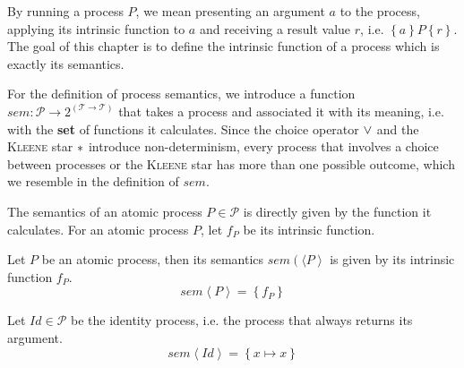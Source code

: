 By running a process $P$, we mean presenting an argument $a$ to the process, applying its intrinsic function to $a$ and receiving a result value $r$, i.e. $\left\{ a \right\} P \left\{ r \right\}$. The goal of this chapter is to define the intrinsic function of a process which is exactly its semantics.

For the definition of process semantics, we introduce a function $sem \colon \mathcal{P} \to 2^{\left( \mathcal{T} \to \mathcal{T} \right)}$ that takes a process and associated it with its meaning, i.e. with the \textbf{set} of functions it calculates. Since the choice operator $\vee$ and the \textsc{Kleene} star $*$ introduce non-determinism, every process that involves a choice between processes or the \textsc{Kleene} star has more than one possible outcome, which we resemble in the definition of $sem$.



The semantics of an atomic process $P \in \mathcal{P}$ is directly given by the function it calculates. For an atomic process $P$, let $f_P$ be its intrinsic function.
\begin{definition}
  \label{def:sem_atomic}
  Let $P$ be an atomic process, then its semantics $sem \left(\langle P \right\rangle$ is given by its intrinsic function $f_P$.
  \begin{equation}
    \label{eqn:sem_atomic}
    sem \left\langle P \right\rangle = \left\{ f_P \right\}
  \end{equation}
  \hfill\qedsymbol
\end{definition}



\begin{definition}
\label{def:sem_id}
Let $Id \in \mathcal{P}$ be the identity process, i.e. the process that always returns its argument.
\begin{equation}
  \label{eqn:sem_id}
  sem \left\langle Id \right\rangle = \left\{ x \mapsto x \right\}
\end{equation}
\hfill\qedsymbol
\end{definition}



